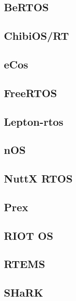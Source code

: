 \subsection{BeRTOS}


\subsection{ChibiOS/RT}


\subsection{eCos}


\subsection{FreeRTOS}


\subsection{Lepton-rtos}


\subsection{nOS}


\subsection{NuttX RTOS}


\subsection{Prex}


\subsection{RIOT OS}


\subsection{RTEMS}


\subsection{SHaRK}



